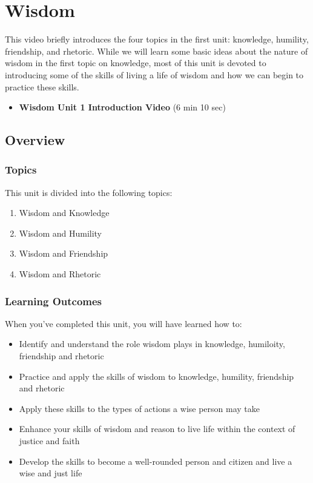 \documentclass[
]{book}
\providecommand{\tightlist}{%
  \setlength{\itemsep}{0pt}\setlength{\parskip}{0pt}}
\begin{document}
\hypertarget{wisdom}{%
\chapter{Wisdom}\label{wisdom}}

This video briefly introduces the four topics in the first unit: knowledge, humility, friendship, and rhetoric. While we will learn some basic ideas about the nature of wisdom in the first topic on knowledge, most of this unit is devoted to introducing some of the skills of living a life of wisdom and how we can begin to practice these skills.

\begin{itemize}
\tightlist
\item
  \textbf{Wisdom Unit 1 Introduction Video} (6 min 10 sec)
\end{itemize}

\hypertarget{overview}{%
\section*{Overview}\label{overview}}

\hypertarget{topics}{%
\subsection*{Topics}\label{topics}}

This unit is divided into the following topics:

\begin{enumerate}
\def\labelenumi{\arabic{enumi}.}
\tightlist
\item
  Wisdom and Knowledge
\item
  Wisdom and Humility
\item
  Wisdom and Friendship
\item
  Wisdom and Rhetoric
\end{enumerate}

\hypertarget{learning-outcomes}{%
\subsection*{Learning Outcomes}\label{learning-outcomes}}

When you've completed this unit, you will have learned how to:

\begin{itemize}
\tightlist
\item
  Identify and understand the role wisdom plays in knowledge, humiloity, friendship and rhetoric
\item
  Practice and apply the skills of wisdom to knowledge, humility, friendship and rhetoric
\item
  Apply these skills to the types of actions a wise person may take
\item
  Enhance your skills of wisdom and reason to live life within the context of justice and faith
\item
  Develop the skills to become a well-rounded person and citizen and live a wise and just life
\end{itemize}
\end{document}
